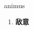 
\begin{frame}
{\huge animus}
\begin{center}
\begin{enumerate}\Large
  \item \textbf{敌意}
\end{enumerate}
\end{center}
\end{frame}

